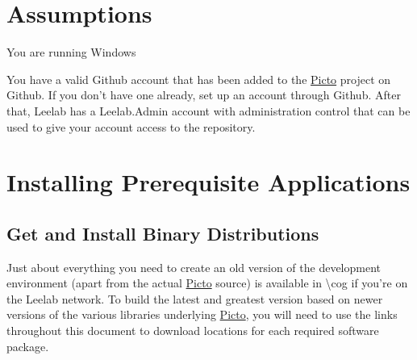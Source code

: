 \hypertarget{build_environment_preparation_assumptions}{}\section{Assumptions}\label{build_environment_preparation_assumptions}

\begin{DoxyItemize}
\item You are running Windows
\item You have a valid Github account that has been added to the \hyperlink{namespace_picto}{Picto} project on Github. If you don't have one already, set up an account through Github. After that, Leelab has a Leelab.\-Admin account with administration control that can be used to give your account access to the repository.
\end{DoxyItemize}\hypertarget{build_environment_preparation_installing_prerequisites}{}\section{Installing Prerequisite Applications}\label{build_environment_preparation_installing_prerequisites}
\hypertarget{build_environment_preparation_get_install_binary}{}\subsection{Get and Install Binary Distributions}\label{build_environment_preparation_get_install_binary}
Just about everything you need to create an old version of the development environment (apart from the actual \hyperlink{namespace_picto}{Picto} source) is available in \textbackslash{}cog if you're on the Leelab network. To build the latest and greatest version based on newer versions of the various libraries underlying \hyperlink{namespace_picto}{Picto}, you will need to use the links throughout this document to download locations for each required software package.



